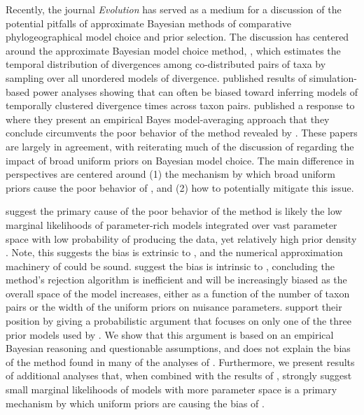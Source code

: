 Recently, the journal \emph{Evolution} has served as a medium for a discussion
of the potential pitfalls of approximate Bayesian methods of comparative
phylogeographical model choice and prior selection.
The discussion has centered around the approximate Bayesian model choice method,
\msb, which estimates the temporal distribution of divergences among
co-distributed pairs of taxa \citep{Huang2011} by sampling over all
unordered models of divergence.
\citet{Oaks2012} published results of simulation-based power analyses
showing that \msb can often be biased toward inferring models of temporally
clustered divergence times across taxon pairs.
\citet{Hickerson2013} published a response to \citet{Oaks2012} where they
present an empirical Bayes model-averaging approach that they conclude
circumvents the poor behavior of the method revealed by \citet{Oaks2012}.
These papers are largely in agreement, with \citet{Hickerson2013} reiterating
much of the discussion of \citet{Oaks2012} regarding the impact of broad
uniform priors on Bayesian model choice.
The main difference in perspectives are centered around
(1) the mechanism by which broad uniform priors cause the poor behavior of
\msb, and
(2) how to potentially mitigate this issue.

\citet{Oaks2012} suggest the primary cause of the poor behavior of the method
is likely the low marginal likelihoods of parameter-rich models integrated over
vast parameter space with low probability of producing the data, yet relatively
high prior density \citep{Lindley1957}.
Note, this suggests the bias is extrinsic to \msb, and the numerical
approximation machinery of \msb could be sound.
\citet{Hickerson2013} suggest the bias is intrinsic to \msb, concluding the
method's rejection algorithm is inefficient and will be increasingly biased as
the overall space of the model increases, either as a function of the number of
taxon pairs or the width of the uniform priors on nuisance parameters.
\citet{Hickerson2013} support their position by giving a probabilistic argument
that focuses on only one of the three prior models used by \citet{Oaks2012}.
We show that this argument is based on an empirical Bayesian reasoning and
questionable assumptions, and does not explain the bias of the method found in
many of the analyses of \citet{Oaks2012}. 
Furthermore, we present results of additional analyses that, when combined with
the results of \citet{Oaks2012}, strongly suggest small marginal likelihoods of
models with more parameter space is a primary mechanism by which uniform priors
are causing the bias of \msb.

